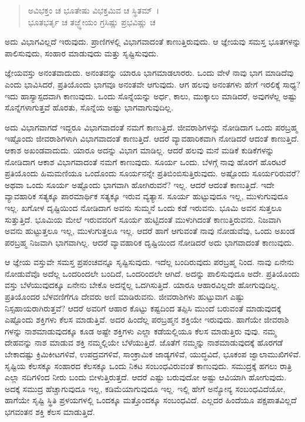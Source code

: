 \begin{verse}
ಅವಿಭಕ್ತಂ ಚ ಭೂತೇಷು ವಿಭಕ್ತಮಿವ ಚ ಸ್ಥಿತಮ್~।\\ಭೂತಭರ್ತೃ ಚ ತಜ್ಜ್ಞೇಯಂ ಗ್ರಸಿಷ್ಣು ಪ್ರಭವಿಷ್ಣು ಚ 
\end{verse}

{\small ಅದು ವಿಭಾಗವಿಲ್ಲದೆ ಇರುವುದು. ಪ್ರಾಣಿಗಳಲ್ಲಿ ವಿಭಾಗವಾದಂತೆ ಕಾಣುತ್ತಿರುವುದು. ಆ ಜ್ಞೇಯವು ಸಮಸ್ತ ಭೂತಗಳನ್ನು ಪಾಲಿಸುವುದು, ಸಂಹಾರ ಮಾಡುವುದು ಮತ್ತು ಸೃಷ್ಟಿಸುವುದು.}

ಜ್ಞೇಯವಸ್ತು ಅನಂತವಾದುದು. ಅನಂತವನ್ನು ಯಾರೂ ಭಾಗಮಾಡಲಾರರು. ಒಂದು ವೇಳೆ ನಾವು ಭಾಗ ಮಾಡಿದೆವು ಎಂದು ಭಾವಿಸಿದರೆ, ಪ್ರತಿಯೊಂದು ಭಾಗವೂ ಅನಂತವೇ ಆಗುವುದು. ಆಗ ಹಲವು ಅನಂತಗಳು ಹೇಗೆ ಇರಲಿಕ್ಕೆ ಸಾಧ್ಯ? ಇದು ಹಾಸ್ಯಾಸ್ಪದವಾಗಿ ಕಾಣುವುದು. ಒಂದು ಸೊನ್ನೆಯನ್ನು ಅರ್ಧ, ಕಾಲು, ಮುಕ್ಕಾಲು ಮಾಡಿದರೆ, ಅವುಗಳೆಲ್ಲ ಅಷ್ಟು ಸೊನ್ನೆಗಳಾಗುತ್ತವೆ ಹೊರತು, ಸೊನ್ನೆಯ ಅಷ್ಟು ಭಾಗವಾಗುವುದಿಲ್ಲ.

ಅದು ವಿಭಾಗವಾಗದೆ ಇದ್ದರೂ ವಿಭಾಗವಾದಂತೆ ನಮಗೆ ಕಾಣುತ್ತಿದೆ. ಜೀವರಾಶಿಗಳನ್ನು ನೋಡಿದಾಗ ಒಂದು ಪರಬ್ರಹ್ಮ ಇಷ್ಟೊಂದು ಜೀವರಾಶಿಗಳಾಗಿ ವಿಭಾಗವಾದಂತೆ ಕಾಣುತ್ತಿದೆ. ಆದರೆ ವ್ಯಾವಹಾರಿಕವಾಗಿ ನೋಡಿದರೆ ಆದಂತೆ ಕಾಣುತ್ತಿದೆ. ಆಕಾಶ ಅಖಂಡವಾದುದು. ಯಾರೂ ಅದನ್ನು ವಿಭಾಗ ಮಾಡಿಲ್ಲ. ಆದರೆ ಹಲವು ಮನೆ ಮಡಿಕೆ ಕುಡಿಕೆಗಳನ್ನು ನೋಡಿದಾಗ ಆಕಾಶ ವಿಭಾಗವಾದಂತೆ ನಮಗೆ ಕಾಣುವುದು. ಸೂರ್ಯ ಒಂದು. ಬೆಳಗ್ಗೆ ನಾವು ಹೊರಗೆ ಹೊರಟರೆ ಪ್ರತಿಯೊಂದು ಹಿಮಮಣಿಯೂ ಒಂದೊಂದು ಸೂರ್ಯನನ್ನೇ ಪ್ರತಿಬಿಂಬಿಸುತ್ತಿರುವುದು. ಅಷ್ಟೊಂದು ಸೂರ್ಯರಿರುವರೆ? ಅಥವಾ ಒಂದು ಸೂರ್ಯ ಅಷ್ಟೊಂದು ಭಾಗವಾಗಿ ಹೋಗಿರುವನೆ? ಇಲ್ಲ. ಆದರೆ ಆದಂತೆ ಕಾಣುತ್ತಿದೆ. ಇದೇ ವ್ಯಾವಹಾರಿಕ ಸತ್ಯಕ್ಕೂ ಪಾರಮಾರ್ಥಿಕ ಸತ್ಯಕ್ಕೂ ಇರುವ ವ್ಯತ್ಯಾಸ. ಸೂರ್ಯ ಹುಟ್ಟುವುದೂ ಇಲ್ಲ, ಮುಳುಗುವುದೂ ಇಲ್ಲ. ಖಗೋಳ ದೃಷ್ಟಿಯಿಂದ ನೋಡಿದಾಗ ಅವನು ಸುಮ್ಮನೆ ಒಂದು ಕಡೆ ಇರುವನು. ಭೂಮಿ ಅವನ ಸುತ್ತಲೂ ಸುತ್ತುತ್ತಿದೆ. ಭೂಮಿಯ ಮೇಲೆ ಇರುವವರಿಗೆ ಸೂರ್ಯ ಹುಟ್ಟಿದಂತೆ ಮುಳುಗಿದಂತೆ ಕಾಣುತ್ತಿರುವನು. ನಿಜವಾಗಿ ಅವನು ಹುಟ್ಟುತ್ತಲೂ ಇಲ್ಲ, ಮುಳುಗುತ್ತಲೂ ಇಲ್ಲ. ಆದರೆ ಹಾಗೆ ಆಗುವಂತೆ ನಾವು ನೋಡುವೆವು, ಒಂದು ಅಖಂಡ ಪರಬ್ರಹ್ಮ ನಿಜವಾಗಿ ಭಾಗವಾಗಿಲ್ಲ. ಆದರೆ ವ್ಯಾವಹಾರಿಕ ದೃಷ್ಟಿಯಿಂದ ನೋಡಿದರೆ ಅದು ಭಾಗವಾದಂತೆ ಕಾಣುವುದು.

ಆ ಜ್ಞೇಯ ವಸ್ತುವೇ ಸಮಸ್ತ ಪ್ರಪಂಚವನ್ನೂ ಸೃಷ್ಟಿಸುವುದು. ಇದೆಲ್ಲ ಬಂದಿರುವುದು ಪರಬ್ರಹ್ಮ ನಿಂದ. ನಾವು ಏನೇನು ನೋಡುವೆವೊ ಅದೆಲ್ಲ ಒಂದರಿಂದಲೇ ಬಂದಿದೆ, ಒಂದರಿಂದಲೇ ಆಗಿದೆ. ಅದನ್ನು ಪಾಲಿಸುವುದೂ ಅದೇ. ಪ್ರತಿಯೊಂದು ವಸ್ತು ಬೆಳೆಯುವುದಕ್ಕೂ ಏನೇನು ಬೇಕೊ ಅದನ್ನೆಲ್ಲ ಒದಗಿಸುತ್ತಿದೆ. ಯಾರೂ ಆಹಾರವಿಲ್ಲದೇ ಹೋಗುವುದಿಲ್ಲ. ಪ್ರತಿಯೊಂದರ ಬೆಳವಣಿಗೆಗೂ ದೇವರು ಅಣಿ ಮಾಡಿರುವನು. ಜೀವರಾಶಿಗಳು ಹುಟ್ಟುವಾಗ ಎಷ್ಟು ನಿಸ್ಸಹಾಯರಾಗಿರುತ್ತವೆ? ಆದರೆ ಅವರಿಗೆ ಆಹಾರ ಕೊಟ್ಟು ಕಷ್ಟದಿಂದ ತಪ್ಪಿಸಿ ಮುಂದೆ ಬರುವಂತೆ ಮಾಡುವುದಕ್ಕೆ ಎಷ್ಟೊಂದು ಶಕ್ತಿಗಳು ಕೆಲಸ ಮಾಡುತ್ತಿವೆ. ಅದರ ಹಿಂದೆಲ್ಲ ಪರಬ್ರಹ್ಮನ ಶಕ್ತಿಯೇ ಇರುವುದು. ಹಾಗೆಯೇ ಜೀವರಾಶಿ ಗಳನ್ನು ನಾಶಮಾಡುವುದಕ್ಕೂ ಕೂಡ ಅಷ್ಟೇ ಶಕ್ತಿಗಳು ಎಲ್ಲಾ ಕಡೆಯಲ್ಲಿಯೂ ಕೆಲಸ ಮಾಡುತ್ತಿರು ವುವು. ನಮ್ಮ ದೇಹವನ್ನು ನಾಶ ಮಾಡುವ ಶಕ್ತಿ ನಮ್ಮಲ್ಲಿಯೇ ಬೆಳೆಯುತ್ತಿದೆ. ಜೊತೆಗೆ ನಮ್ಮನ್ನು ನಾಶಮಾಡುವುದಕ್ಕೆ ಹೊರಗಡೆ ಬೇಕಾದಷ್ಟು ಕ್ರಿಮಿಕೀಟಗಳಿವೆ, ಉಪದ್ರವಗಳಿವೆ, ಸಾಂಕ್ರಾಮಿಕ ಜಾಡ್ಯಗಳಿವೆ, ಯುದ್ಧವಿದೆ, ಭೂಕಂಪ ಜ್ವಾಲಾಮುಖಿಗಳಿವೆ. ಸೃಷ್ಟಿಯ ಕೆಲಸಕ್ಕೂ ಸಂಹಾರದ ಕೆಲಸಕ್ಕೂ ಒಂದು ನಿಕಟ ಸಂಬಂಧವಿರುವಂತೆ ಕಾಣುವುದು. ಸಮುದ್ರಕ್ಕೆ ಹಗಲು ರಾತ್ರಿ ಎಲ್ಲಾ ನದಿಗಳಿಂದ ನೀರು ಬಂದು ಬೀಳುತ್ತಿರುತ್ತದೆ. ಆದರೆ ಎಷ್ಟು ಬರುವುದೋ ಅಷ್ಟು ಆವಿಯಾಗಿ ಹೋಗುವುದು. ಅದಕ್ಕೆ ಸಮುದ್ರ ಹೆಚ್ಚಾಗುವುದೂ ಇಲ್ಲ, ಕಡಿಮೆಯಾಗುವುದೂ ಇಲ್ಲ. ಇಲ್ಲಿ ಹೇಗೆ ಅನ್ಯೋನ್ಯ ಸಂಬಂಧವಿದೆಯೋ, ಹಾಗೆಯೇ ಸೃಷ್ಟಿ ಸ್ಥಿತಿ ಪ್ರಳಯಗಳಲ್ಲಿ ಒಂದಕ್ಕೂ ಮತ್ತೊಂದಕ್ಕೂ ಸಂಬಂಧವಿದೆ. ಎಲ್ಲದರ ಹಿಂದೆಯೂ ಪಕ್ಷಪಾತವಿಲ್ಲದೆ ಭಗವಂತನ ಶಕ್ತಿ ಕೆಲಸ ಮಾಡುತ್ತಿದೆ.

